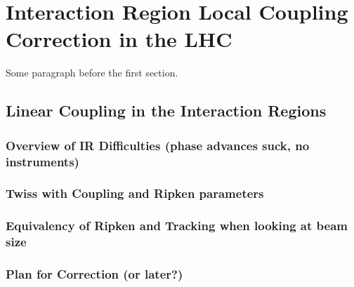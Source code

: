 
\chapter{Interaction Region Local Coupling Correction in the LHC} %

\label{Chapter3} %




Some paragraph before the first section.


\section{Linear Coupling in the Interaction Regions}

\subsection{Overview of IR Difficulties (phase advances suck, no instruments)}

\subsection{Twiss with Coupling and Ripken parameters}

\subsection{Equivalency of Ripken and Tracking when looking at beam size}

\subsection{Plan for Correction (or later?)}


